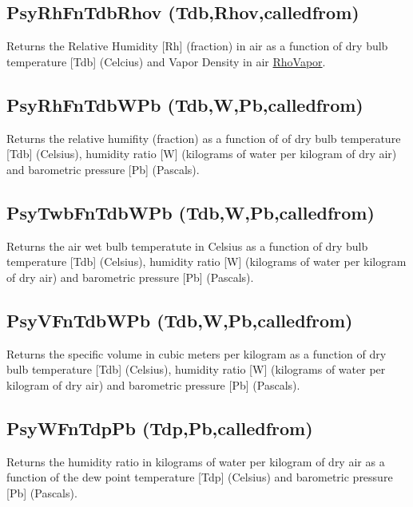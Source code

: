 \subsection{PsyRhFnTdbRhov (Tdb,Rhov,calledfrom)}\label{psyrhfntdbrhov-tdbrhovcalledfrom}

Returns the Relative Humidity {[}Rh{]} (fraction) in air as a function of dry bulb temperature {[}Tdb{]} (Celcius) and Vapor Density in air \href{kilograms\%20of\%20water\%20per\%20cubic\%20meter\%20of\%20air}{RhoVapor}.

\subsection{PsyRhFnTdbWPb (Tdb,W,Pb,calledfrom)}\label{psyrhfntdbwpb-tdbwpbcalledfrom}

Returns the relative humifity (fraction) as a function of of dry bulb temperature {[}Tdb{]} (Celsius), humidity ratio {[}W{]} (kilograms of water per kilogram of dry air) and barometric pressure {[}Pb{]} (Pascals).

\subsection{PsyTwbFnTdbWPb (Tdb,W,Pb,calledfrom)}\label{psytwbfntdbwpb-tdbwpbcalledfrom}

Returns the air wet bulb temperatute in Celsius as a function of dry bulb temperature {[}Tdb{]} (Celsius), humidity ratio {[}W{]} (kilograms of water per kilogram of dry air) and barometric pressure {[}Pb{]} (Pascals).

\subsection{PsyVFnTdbWPb (Tdb,W,Pb,calledfrom)}\label{psyvfntdbwpb-tdbwpbcalledfrom}

Returns the specific volume in cubic meters per kilogram as a function of dry bulb temperature {[}Tdb{]} (Celsius), humidity ratio {[}W{]} (kilograms of water per kilogram of dry air) and barometric pressure {[}Pb{]} (Pascals).

\subsection{PsyWFnTdpPb (Tdp,Pb,calledfrom)}\label{psywfntdppb-tdppbcalledfrom}

Returns the humidity ratio in kilograms of water per kilogram of dry air as a function of the dew point temperature {[}Tdp{]} (Celsius) and barometric pressure {[}Pb{]} (Pascals).

